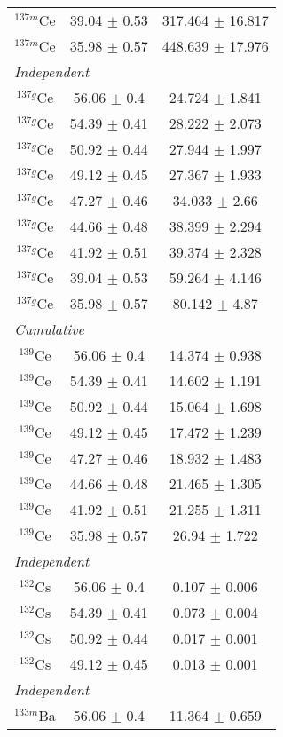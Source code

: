 \begin{ruledtabular}
\begin{tabular}{ccc}
$^{137m}$Ce & 39.04 $\pm$ 0.53 & 317.464 $\pm$ 16.817 \\ 
$^{137m}$Ce & 35.98 $\pm$ 0.57 & 448.639 $\pm$ 17.976 \\ 
\hline
\multicolumn{3}{l}{\textit{Independent}} \\ 
$^{137g}$Ce & 56.06 $\pm$ 0.4 & 24.724 $\pm$ 1.841 \\ 
$^{137g}$Ce & 54.39 $\pm$ 0.41 & 28.222 $\pm$ 2.073 \\ 
$^{137g}$Ce & 50.92 $\pm$ 0.44 & 27.944 $\pm$ 1.997 \\ 
$^{137g}$Ce & 49.12 $\pm$ 0.45 & 27.367 $\pm$ 1.933 \\ 
$^{137g}$Ce & 47.27 $\pm$ 0.46 & 34.033 $\pm$ 2.66 \\ 
$^{137g}$Ce & 44.66 $\pm$ 0.48 & 38.399 $\pm$ 2.294 \\ 
$^{137g}$Ce & 41.92 $\pm$ 0.51 & 39.374 $\pm$ 2.328 \\ 
$^{137g}$Ce & 39.04 $\pm$ 0.53 & 59.264 $\pm$ 4.146 \\ 
$^{137g}$Ce & 35.98 $\pm$ 0.57 & 80.142 $\pm$ 4.87 \\ 
\hline
\multicolumn{3}{l}{\textit{Cumulative}} \\ 
$^{139}$Ce & 56.06 $\pm$ 0.4 & 14.374 $\pm$ 0.938 \\ 
$^{139}$Ce & 54.39 $\pm$ 0.41 & 14.602 $\pm$ 1.191 \\ 
$^{139}$Ce & 50.92 $\pm$ 0.44 & 15.064 $\pm$ 1.698 \\ 
$^{139}$Ce & 49.12 $\pm$ 0.45 & 17.472 $\pm$ 1.239 \\ 
$^{139}$Ce & 47.27 $\pm$ 0.46 & 18.932 $\pm$ 1.483 \\ 
$^{139}$Ce & 44.66 $\pm$ 0.48 & 21.465 $\pm$ 1.305 \\ 
$^{139}$Ce & 41.92 $\pm$ 0.51 & 21.255 $\pm$ 1.311 \\ 
$^{139}$Ce & 35.98 $\pm$ 0.57 & 26.94 $\pm$ 1.722 \\ 
\hline
\multicolumn{3}{l}{\textit{Independent}} \\ 
$^{132}$Cs & 56.06 $\pm$ 0.4 & 0.107 $\pm$ 0.006 \\ 
$^{132}$Cs & 54.39 $\pm$ 0.41 & 0.073 $\pm$ 0.004 \\ 
$^{132}$Cs & 50.92 $\pm$ 0.44 & 0.017 $\pm$ 0.001 \\ 
$^{132}$Cs & 49.12 $\pm$ 0.45 & 0.013 $\pm$ 0.001 \\ 
\hline
\multicolumn{3}{l}{\textit{Independent}} \\ 
$^{133m}$Ba & 56.06 $\pm$ 0.4 & 11.364 $\pm$ 0.659 \\ 

\end{tabular}
\end{ruledtabular}
